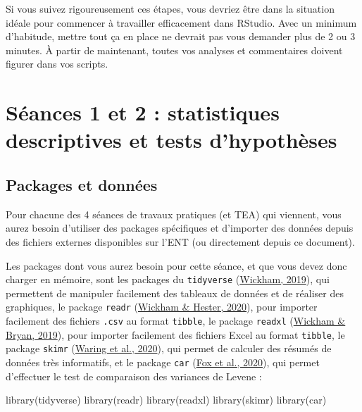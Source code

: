 \documentclass[
  a4paper,
]{article}
\newenvironment{Shaded}{\begin{snugshade}}{\end{snugshade}}
\newcommand{\FunctionTok}[1]{\textcolor[rgb]{0.39,0.29,0.61}{#1}}
\newcommand{\NormalTok}[1]{\textcolor[rgb]{0.12,0.11,0.11}{#1}}
\begin{document}
Si vous suivez rigoureusement ces étapes, vous devriez être dans la situation idéale pour commencer à travailler efficacement dans RStudio. Avec un minimum d'habitude, mettre tout ça en place ne devrait pas vous demander plus de 2 ou 3 minutes. À partir de maintenant, toutes vos analyses et commentaires doivent figurer dans vos scripts.

\hypertarget{seance1}{%
\section{Séances 1 et 2 : statistiques descriptives et tests d'hypothèses}\label{seance1}}

\hypertarget{packages}{%
\subsection{Packages et données}\label{packages}}

Pour chacune des 4 séances de travaux pratiques (et TEA) qui viennent, vous aurez besoin d'utiliser des packages spécifiques et d'importer des données depuis des fichiers externes disponibles sur l'ENT (ou directement depuis ce document).

Les packages dont vous aurez besoin pour cette séance, et que vous devez donc charger en mémoire, sont les packages du \texttt{tidyverse} (\protect\hyperlink{ref-R-tidyverse}{Wickham, 2019}), qui permettent de manipuler facilement des tableaux de données et de réaliser des graphiques, le package \texttt{readr} (\protect\hyperlink{ref-R-readr}{Wickham \& Hester, 2020}), pour importer facilement des fichiers \texttt{.csv} au format \texttt{tibble}, le package \texttt{readxl} (\protect\hyperlink{ref-R-readxl}{Wickham \& Bryan, 2019}), pour importer facilement des fichiers Excel au format \texttt{tibble}, le package \texttt{skimr} (\protect\hyperlink{ref-R-skimr}{Waring et al., 2020}), qui permet de calculer des résumés de données très informatifs, et le package \texttt{car} (\protect\hyperlink{ref-R-car}{Fox et al., 2020}), qui permet d'effectuer le test de comparaison des variances de Levene :

\begin{Shaded}
\begin{Highlighting}[]
\FunctionTok{library}\NormalTok{(tidyverse)}
\FunctionTok{library}\NormalTok{(readr)}
\FunctionTok{library}\NormalTok{(readxl)}
\FunctionTok{library}\NormalTok{(skimr)}
\FunctionTok{library}\NormalTok{(car)}
\end{Highlighting}
\end{Shaded}
\end{document}
